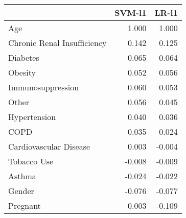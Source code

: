 \begin{tabular}{lrr}
\toprule
{} &  SVM-l1 &  LR-l1 \\
\midrule
Age                         &   1.000 &  1.000 \\
Chronic Renal Insufficiency &   0.142 &  0.125 \\
Diabetes                    &   0.065 &  0.064 \\
Obesity                     &   0.052 &  0.056 \\
Immunosuppression           &   0.060 &  0.053 \\
Other                       &   0.056 &  0.045 \\
Hypertension                &   0.040 &  0.036 \\
COPD                        &   0.035 &  0.024 \\
Cardiovascular Disease      &   0.003 & -0.004 \\
Tobacco Use                 &  -0.008 & -0.009 \\
Asthma                      &  -0.024 & -0.022 \\
Gender                      &  -0.076 & -0.077 \\
Pregnant                    &   0.003 & -0.109 \\
\bottomrule
\end{tabular}
